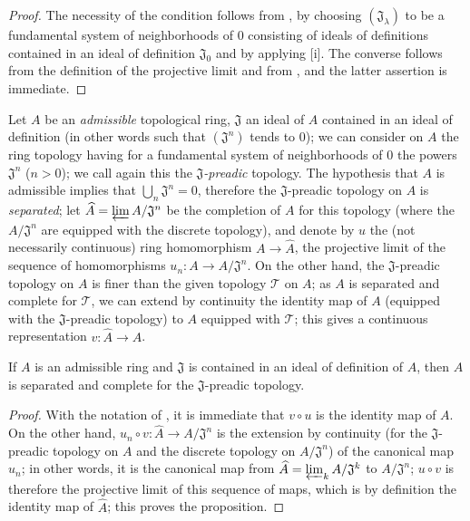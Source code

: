 \begin{proof}
The necessity of the condition follows from , by choosing
$(\mathfrak{J}_\lambda)$ to be a fundamental system of neighborhoods of $0$
consisting of ideals of definitions contained in an ideal of definition
$\mathfrak{J}_0$ and by applying [i]. The converse follows
from the definition of the projective limit and from , and the
latter assertion is immediate.
\end{proof}

\begin{env}[7.2.3]
\label{0.7.2.3}
Let $A$ be an \emph{admissible} topological ring, $\mathfrak{J}$ an ideal of $A$
contained in an ideal of definition (in other words  such that
$(\mathfrak{J}^n)$ tends to $0$); we can consider on $A$ the ring topology
having for a fundamental system of neighborhoods of $0$ the powers
$\mathfrak{J}^n$ ($n>0$); we call again this the \emph{$\mathfrak{J}$-preadic}
topology. The hypothesis that $A$ is admissible implies that
$\bigcup_n\mathfrak{J}^n=0$, therefore the $\mathfrak{J}$-preadic topology on
$A$ is \emph{separated}; let $\widehat{A}=\varprojlim A/\mathfrak{J}^n$ be the
completion of $A$ for this topology (where the $A/\mathfrak{J}^n$ are equipped
with the discrete topology), and denote by $u$ the (not necessarily continuous)
ring homomorphism $A\to\widehat{A}$, the projective limit of the sequence of
homomorphisms $u_n:A\to A/\mathfrak{J}^n$. On the other hand, the
$\mathfrak{J}$-preadic topology on $A$ is finer than the given topology
$\mathcal{T}$ on $A$; as $A$ is separated and complete for $\mathcal{T}$, we can
extend by continuity the identity map of $A$ (equipped with the
$\mathfrak{J}$-preadic topology) to $A$ equipped with $\mathcal{T}$; this
gives a continuous representation $v:\widehat{A}\to A$.
\end{env}

\begin{proposition}[7.2.4]
\label{0.7.2.4}
If $A$ is an admissible ring and $\mathfrak{J}$ is contained in an ideal of
definition of $A$, then $A$ is separated and complete for the
$\mathfrak{J}$-preadic topology.
\end{proposition}

\begin{proof}
With the notation of , it is immediate that
$v\circ u$ is the identity map of $A$. On the other hand,
$u_n\circ v:\widehat{A}\to A/\mathfrak{J}^n$ is the extension by continuity (for
the $\mathfrak{J}$-preadic topology on $A$ and the discrete topology on
$A/\mathfrak{J}^n$) of the canonical map $u_n$; in other words, it is the
canonical map from $\widehat{A}=\varprojlim_k A/\mathfrak{J}^k$ to
$A/\mathfrak{J}^n$; $u\circ v$ is therefore the projective limit of this
sequence of maps, which is by definition the identity map of
$\widehat{A}$; this proves the proposition.
\end{proof}


